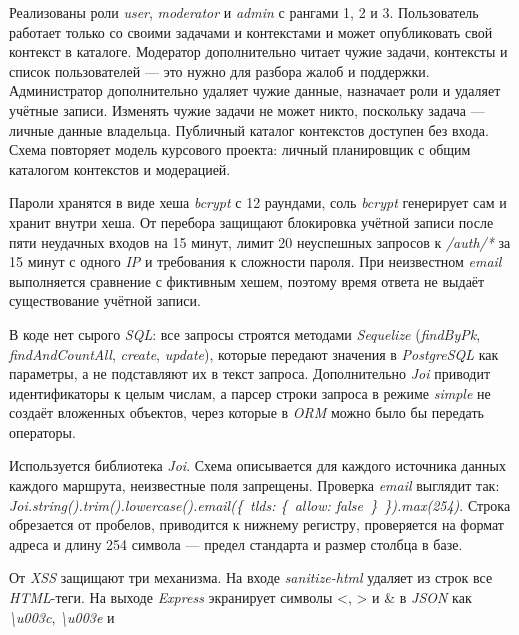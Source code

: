 \documentclass{stp}
\begin{document}
\begin{stpnum}
  \item Реализованы роли \textit{user}, \textit{moderator} и \textit{admin} с рангами 1, 2 и 3.
    Пользователь работает только со своими задачами и контекстами и
    может опубликовать свой контекст в каталоге. Модератор дополнительно
    читает чужие задачи, контексты и список пользователей — это нужно
    для разбора жалоб и поддержки. Администратор дополнительно удаляет
    чужие данные, назначает роли и удаляет учётные записи. Изменять
    чужие задачи не может никто, поскольку задача — личные данные
    владельца. Публичный каталог контекстов доступен без входа. Схема
    повторяет модель курсового проекта: личный планировщик с общим
    каталогом контекстов и модерацией.
  \item Пароли хранятся в виде хеша \textit{bcrypt} с 12 раундами, соль \textit{bcrypt}
    генерирует сам и хранит внутри хеша. От перебора защищают
    блокировка учётной записи после пяти неудачных входов на 15 минут,
    лимит 20 неуспешных запросов к \textit{/auth/*} за 15 минут с одного \textit{IP} и
    требования к сложности пароля. При неизвестном \textit{email} выполняется
    сравнение с фиктивным хешем, поэтому время ответа не выдаёт
    существование учётной записи.
  \item В коде нет сырого \textit{SQL}: все запросы строятся методами \textit{Sequelize}
    (\textit{findByPk}, \textit{findAndCountAll}, \textit{create}, \textit{update}), которые передают
    значения в \textit{PostgreSQL} как параметры, а не подставляют их в текст
    запроса. Дополнительно \textit{Joi} приводит идентификаторы к целым числам,
    а парсер строки запроса в режиме \textit{simple} не создаёт вложенных
    объектов, через которые в \textit{ORM} можно было бы передать операторы.
  \item Используется библиотека \textit{Joi}. Схема описывается для каждого
    источника данных каждого маршрута, неизвестные поля запрещены.
    Проверка \textit{email} выглядит так: \textit{Joi.string().trim().lowercase()\allowbreak.email(\{~tlds: \{~allow: false~\}~\})\allowbreak.max(254)}. Строка обрезается от
    пробелов, приводится к нижнему регистру, проверяется на формат
    адреса и длину 254 символа — предел стандарта и размер столбца
    в базе.
  \item От \textit{XSS} защищают три механизма. На входе \textit{sanitize-html} удаляет
    из строк все \textit{HTML}-теги. На выходе \textit{Express} экранирует символы <, >
    и \& в \textit{JSON} как \textit{\textbackslash u003c}, \textit{\textbackslash u003e} и

\end{stpnum}
\end{document}
